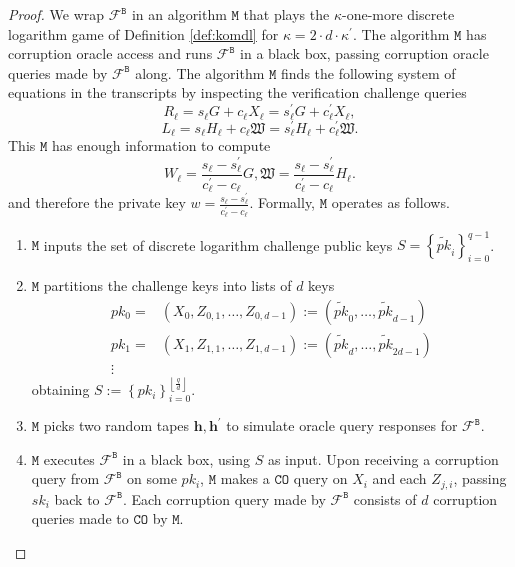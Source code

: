 \documentclass{llncs}
\begin{document}
\begin{proof}
We wrap $\mathcal{F}^{\texttt{B}}$ in an algorithm $\texttt{M}$ that plays the $\kappa$-one-more discrete logarithm game of Definition \ref{def:komdl} for $\kappa = 2\cdot d \cdot \kappa^\prime$. The algorithm $\texttt{M}$ has corruption oracle access and runs $\mathcal{F}^{\texttt{B}}$ in a black box, passing corruption oracle queries made by $\mathcal{F}^{\texttt{B}}$ along. The algorithm $\texttt{M}$ finds the following system of equations in the transcripts by inspecting the verification challenge queries
\[R_\ell = s_\ell G + c_\ell X_\ell = s_\ell^\prime G + c_\ell^\prime X_\ell,\]
\[L_\ell = s_\ell H_\ell + c_\ell \mathfrak{W} = s_\ell^\prime H_\ell + c_\ell^\prime \mathfrak{W}.\] This $\texttt{M}$ has enough information to compute
\[ W_\ell = \frac{s_\ell - s_\ell^\prime}{c_\ell^\prime - c_\ell} G,  \mathfrak{W} = \frac{s_\ell - s_\ell^\prime}{c_\ell^\prime - c_\ell} H_\ell.\]
and therefore the private key $w = \frac{s_{\ell} - s_\ell^\prime}{c_\ell^\prime - c_\ell}$. Formally, $\texttt{M}$ operates as follows.

\begin{enumerate}[(1)]
\item $\texttt{M}$ inputs the set of discrete logarithm challenge public keys $S = \left\{\widetilde{pk}_i\right\}_{i=0}^{q-1}$.

\item $\texttt{M}$ partitions the challenge keys into lists of $d$ keys
\begin{align*}
pk_0 =&  (X_0, Z_{0, 1}, \ldots, Z_{0, d-1}) := (\widetilde{pk}_0, \ldots, \widetilde{pk}_{d-1}) \\
pk_1 =& (X_1, Z_{1, 1}, \ldots, Z_{1, d-1}) := (\widetilde{pk}_d, \ldots, \widetilde{pk}_{2d-1}) \\
\vdots
\end{align*} obtaining $S := \left\{pk_i\right\}_{i=0}^{\left\lfloor \frac{q}{d}\right\rfloor}$.

\item $\texttt{M}$ picks two random tapes $\textbf{h}, \textbf{h}^\prime$ to simulate oracle query responses for $\mathcal{F}^{\texttt{B}}$.

\item $\texttt{M}$ executes $\mathcal{F}^{\texttt{B}}$ in a black box, using $S$ as input. Upon receiving a corruption query from $\mathcal{F}^{\texttt{B}}$ on some $pk_i$, $\texttt{M}$ makes a $\texttt{CO}$ query on $X_i$ and each $Z_{j,i}$, passing $sk_i$ back to $\mathcal{F}^{\texttt{B}}$. Each corruption query made by $\mathcal{F}^{\texttt{B}}$ consists of $d$ corruption queries made to $\texttt{CO}$ by $\texttt{M}$.


\end{enumerate}
\end{proof}
\end{document}
